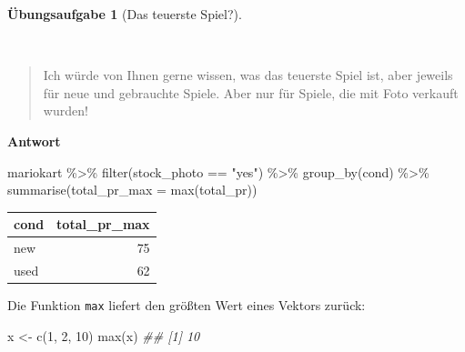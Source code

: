 \documentclass[
  letterpaper,
]{scrbook}
\newenvironment{Shaded}{\begin{snugshade}}{\end{snugshade}}
\newcommand{\AttributeTok}[1]{\textcolor[rgb]{0.40,0.45,0.13}{#1}}
\newcommand{\DecValTok}[1]{\textcolor[rgb]{0.68,0.00,0.00}{#1}}
\newcommand{\DocumentationTok}[1]{\textcolor[rgb]{0.37,0.37,0.37}{\textit{#1}}}
\newcommand{\FunctionTok}[1]{\textcolor[rgb]{0.28,0.35,0.67}{#1}}
\newcommand{\NormalTok}[1]{\textcolor[rgb]{0.00,0.23,0.31}{#1}}
\newcommand{\OtherTok}[1]{\textcolor[rgb]{0.00,0.23,0.31}{#1}}
\newcommand{\SpecialCharTok}[1]{\textcolor[rgb]{0.37,0.37,0.37}{#1}}
\newcommand{\StringTok}[1]{\textcolor[rgb]{0.13,0.47,0.30}{#1}}
\theoremstyle{definition}
\theoremstyle{definition}
\theoremstyle{definition}
\newtheorem{exercise}{Übungsaufgabe}[chapter]
\theoremstyle{remark}
\begin{document}
\begin{exercise}[Das teuerste
Spiel?]\protect\hypertarget{exr-fofrage1}{}\label{exr-fofrage1}

~

\begin{quote}
{} Ich würde von Ihnen gerne wissen, was das teuerste Spiel
ist, aber jeweils für neue und gebrauchte Spiele. Aber nur für Spiele,
die mit Foto verkauft wurden!
\end{quote}

\textbf{Antwort}

\begin{Shaded}
\begin{Highlighting}[]
\NormalTok{mariokart }\SpecialCharTok{\%\textgreater{}\%} 
  \FunctionTok{filter}\NormalTok{(stock\_photo }\SpecialCharTok{==} \StringTok{"yes"}\NormalTok{) }\SpecialCharTok{\%\textgreater{}\%} 
  \FunctionTok{group\_by}\NormalTok{(cond) }\SpecialCharTok{\%\textgreater{}\%} 
  \FunctionTok{summarise}\NormalTok{(}\AttributeTok{total\_pr\_max =} \FunctionTok{max}\NormalTok{(total\_pr))}
\end{Highlighting}
\end{Shaded}

\begin{longtable}[]{@{}lr@{}}
\toprule\noalign{}
cond & total\_pr\_max \\
\midrule\noalign{}
\endhead
\bottomrule\noalign{}
\endlastfoot
new & 75 \\
used & 62 \\
\end{longtable}

Die Funktion \texttt{max} liefert den größten Wert eines Vektors zurück:

\begin{Shaded}
\begin{Highlighting}[]
\NormalTok{x }\OtherTok{\textless{}{-}} \FunctionTok{c}\NormalTok{(}\DecValTok{1}\NormalTok{, }\DecValTok{2}\NormalTok{, }\DecValTok{10}\NormalTok{)}
\FunctionTok{max}\NormalTok{(x)}
\DocumentationTok{\#\# [1] 10}
\end{Highlighting}
\end{Shaded}

\end{exercise}
\end{document}
